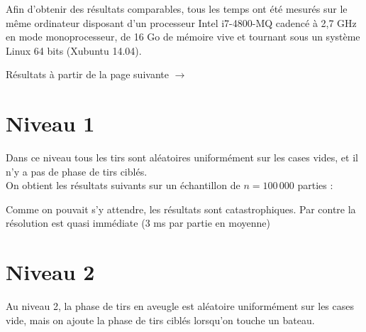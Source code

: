 Afin d'obtenir des résultats comparables, tous les temps ont été mesurés sur le même ordinateur disposant d'un processeur Intel i7-4800-MQ cadencé à 2,7 GHz en mode monoprocesseur, de 16 Go de mémoire vive et tournant sous un système Linux 64 bits (Xubuntu 14.04).

\vfill 
\begin{flushright}
Résultats à partir de la page suivante $\rightarrow$
\end{flushright}
\newpage
\section{Niveau 1}
Dans ce niveau tous les tirs sont aléatoires uniformément sur les cases vides, et il n'y a pas de phase de tirs ciblés.\\
On obtient les résultats suivants sur un échantillon de $n=100\,000$ parties :

\begin{center}
\end{center}

Comme on pouvait s'y attendre, les résultats sont catastrophiques. Par contre la résolution est quasi immédiate (3 ms par partie en moyenne)
\newpage
\section{Niveau 2}
Au niveau 2, la phase de tirs en aveugle est aléatoire uniformément sur les cases vide, mais on ajoute la phase de tirs ciblés lorsqu'on touche un bateau.

